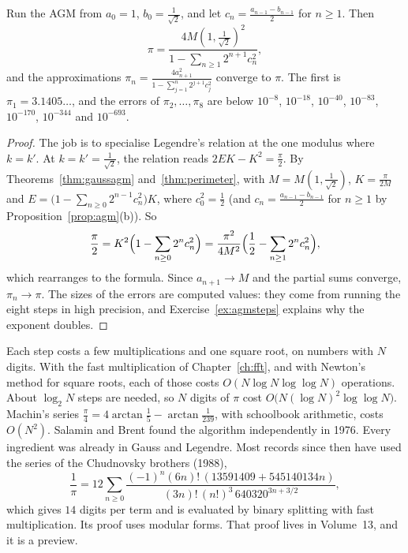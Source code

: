 \begin{theorem}\label{thm:brentsalamin}
Run the AGM from $a_0=1$, $b_0=\frac1{\sqrt2}$, and let $c_n=\frac{a_{n-1}-b_{n-1}}2$ for $n\ge1$. Then
\[
\pi=\frac{4M(1,\frac1{\sqrt2})^2}{1-\sum_{n\ge1}2^{n+1}c_n^2},
\]
and the approximations $\pi_n=\frac{4a_{n+1}^2}{1-\sum_{j=1}^{n}2^{j+1}c_j^2}$ converge to $\pi$. The first is $\pi_1=3.1405\ldots$, and the errors of $\pi_2,\dots,\pi_8$ are below $10^{-8}$, $10^{-18}$, $10^{-40}$, $10^{-83}$, $10^{-170}$, $10^{-344}$ and $10^{-693}$.
\end{theorem}
\begin{proof}
The job is to specialise Legendre's relation at the one modulus where $k=k'$. At $k=k'=\frac1{\sqrt2}$, the relation reads $2EK-K^2=\frac\pi2$. By Theorems~\ref{thm:gaussagm} and~\ref{thm:perimeter}, with $M=M(1,\frac1{\sqrt2})$, $K=\frac\pi{2M}$ and
$E=\bigl(1-\sum_{n\ge0}2^{n-1}c_n^2\bigr)K$, where $c_0^2=\frac12$ (and $c_n=\frac{a_{n-1}-b_{n-1}}2$ for $n\ge1$ by Proposition~\ref{prop:agm}(b)). So
\[
\frac\pi2=K^2\Bigl(1-\sum_{n\ge0}2^nc_n^2\Bigr)=\frac{\pi^2}{4M^2}\Bigl(\frac12-\sum_{n\ge1}2^nc_n^2\Bigr),
\]
which rearranges to the formula. Since $a_{n+1}\to M$ and the partial sums converge, $\pi_n\to\pi$. The sizes of the errors are computed values:
they come from running the eight steps in high precision, and Exercise~\ref{ex:agmsteps} explains why the exponent doubles.
\end{proof}

\begin{remark}
Each step costs a few multiplications and one square root, on numbers with $N$ digits. With the fast multiplication of Chapter~\ref{ch:fft}, and with Newton's method for square roots, each of those costs $O(N\log N\log\log N)$ operations. About $\log_2 N$ steps are needed, so $N$ digits of $\pi$ cost $O\bigl(N(\log N)^2\log\log N\bigr)$. Machin's series $\frac\pi4=4\arctan\frac15-\arctan\frac1{239}$, with schoolbook arithmetic, costs $O(N^2)$. Salamin and Brent found the algorithm independently in 1976. Every ingredient was already in Gauss and Legendre. Most records since then have used the series of the Chudnovsky brothers (1988),
\[
\frac1\pi=12\sum_{n\ge0}\frac{(-1)^n(6n)!\,(13591409+545140134n)}{(3n)!\,(n!)^3\,640320^{3n+3/2}},
\]
which gives $14$ digits per term and is evaluated by binary splitting with fast multiplication. Its proof uses modular forms. That proof lives in Volume~13, and it is a preview.
\end{remark}

